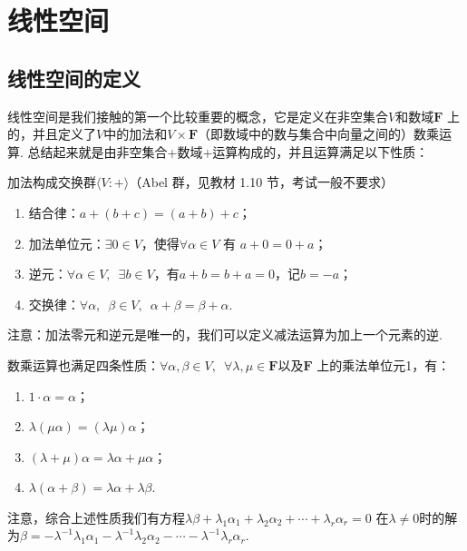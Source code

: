 \chapter{线性空间}

\section{线性空间的定义}
线性空间是我们接触的第一个比较重要的概念，它是定义在非空集合$V$和数域$\mathbf{F}$
上的，并且定义了$V$中的加法和$V\times \mathbf{F}$（即数域中的数与集合中向量之间的）数乘运算.
总结起来就是由非空集合+数域+运算构成的，并且运算满足以下性质：

加法构成交换群$\langle V:+\rangle$（Abel 群，见教材 1.10 节，考试一般不要求）

\begin{enumerate}
    \item 结合律：$a+(b+c)=(a+b)+c$；

    \item 加法单位元：$\exists 0 \in V$，使得$\forall\alpha\in V$ 有 $a+0=0+a$；

    \item 逆元：$\forall\alpha\in V,\enspace \exists b\in V$，有$a+b=b+a=0$，记$b=-a$；

    \item 交换律：$\forall\alpha,\enspace \beta\in V,\enspace \alpha+\beta=\beta+\alpha$.
\end{enumerate}

注意：加法零元和逆元是唯一的，我们可以定义减法运算为加上一个元素的逆.

数乘运算也满足四条性质：$\forall \alpha,\beta \in V,\enspace\forall \lambda,\mu\in\mathbf{F}$以及$\mathbf{F}$
上的乘法单位元1，有：
\begin{enumerate}
    \item $1\cdot \alpha=\alpha$；

    \item $\lambda(\mu\alpha)=(\lambda\mu)\alpha$；

    \item $(\lambda+\mu)\alpha=\lambda\alpha+\mu\alpha$；

    \item $\lambda(\alpha+\beta)=\lambda\alpha+\lambda\beta$.
\end{enumerate}

注意，综合上述性质我们有方程$\lambda\beta+\lambda_1\alpha_1+\lambda_2\alpha_2+\cdots+\lambda_r\alpha_r=0$
在$\lambda\neq 0$时的解为$\beta=-\lambda^{-1}\lambda_1\alpha_1-\lambda^{-1}\lambda_2\alpha_2-\cdots-\lambda^{-1}\lambda_r\alpha_r$.

